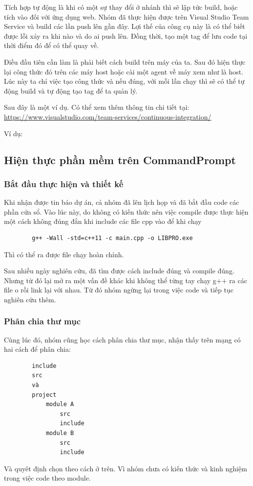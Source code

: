 \documentclass[12pt,a4paper]{report}
\begin{document}
		Tích hợp tự động là khi có một sự thay đổi ở nhánh thì sẽ lập tức build, hoặc tích vào đối với ứng dụng web. Nhóm đã thực hiện được trên Visual Studio Team Service và build các lần push lên gần đây. Lợi thế của công cụ này là có thể biết được lỗi xảy ra khi nào và do ai push lên. Đồng thời, tạo một tag để lưu code tại thời điểm đó để có thể quay về. \par

		Điều đầu tiên cần làm là phải biết cách build trên máy của ta. Sau đó hiện thực lại công thức đó trên các máy host hoặc cài một agent về máy xem như là host. Lúc này ta chỉ việc tạo công thức và nếu đúng, với mỗi lần chạy thì sẽ có thể tự động build và tự động tạo tag để ta quản lý.\par
		
		Sau đây là một ví dụ. Có thể xem thêm thông tin chi tiết tại: \url{https://www.visualstudio.com/team-services/continuous-integration/}\par

		Ví dụ:

		\subsection{Hiện thực phần mềm trên CommandPrompt}
		\subsubsection{Bắt đầu thực hiện và thiết kế}
		Khi nhận được tin báo dự án, cả nhóm đã lên lịch họp và đã bắt đầu code các phần cửa sổ. Vào lúc này, do không có kiến thức nên việc compile được thực hiện một cách không đúng đắn khi include các file cpp vào để khi chạy
		\begin{verbatim}
		g++ -Wall -std=c++11 -c main.cpp -o LIBPRO.exe
		\end{verbatim}
		Thì có thể ra được file chạy hoàn chỉnh.\par

		Sau nhiều ngày nghiên cứu, đã tìm được cách include đúng và compile đúng. Nhưng từ đó lại mở ra một vấn đề khác khi không thể từng tay chạy g++ ra các file o rồi link lại với nhau. Từ đó nhóm ngừng lại trong việc code và tiếp tục nghiên cứu thêm.
		\subsubsection{Phân chia thư mục}
		Cùng lúc đó, nhóm cũng học cách phân chia thư mục, nhận thấy trên mạng có hai cách để phân chia:
		\begin{verbatim}
		include
		src
		và
		project
		    module A
			    src
			    include
			module B
			    src
				include
		\end{verbatim}
		Và quyêt định chọn theo cách ở trên. Vì nhóm chưa có kiến thức và kinh nghiệm trong việc code theo module.
\end{document}
